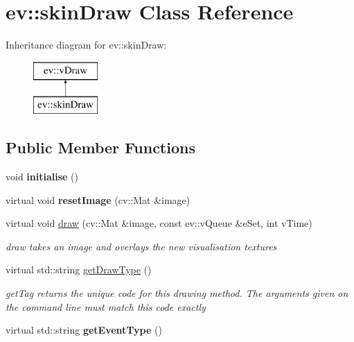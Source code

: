 \hypertarget{classev_1_1skinDraw}{}\section{ev\+:\+:skin\+Draw Class Reference}
\label{classev_1_1skinDraw}
Inheritance diagram for ev\+:\+:skin\+Draw\+:\begin{figure}[H]
\begin{center}
\leavevmode
\includegraphics[height=2.000000cm]{classev_1_1skinDraw}
\end{center}
\end{figure}
\subsection*{Public Member Functions}
\begin{DoxyCompactItemize}
\item 
\mbox{\label{classev_1_1skinDraw_ad3d3dab23e10ceafc546720fddab60e1}} 
void {\bfseries initialise} ()
\item 
\mbox{\label{classev_1_1skinDraw_a0203a5fa2e0d18785c96f1d8bcacbdfd}} 
virtual void {\bfseries reset\+Image} (cv\+::\+Mat \&image)
\item 
virtual void \hyperlink{classev_1_1skinDraw_a4cbf578dd04c6a634c8959fea7295060}{draw} (cv\+::\+Mat \&image, const ev\+::v\+Queue \&e\+Set, int v\+Time)
\begin{DoxyCompactList}\small\item\em draw takes an image and overlays the new visualisation textures \end{DoxyCompactList}\item 
virtual std\+::string \hyperlink{classev_1_1skinDraw_a7015a083dffe5c055808c20b9372bce4}{get\+Draw\+Type} ()
\begin{DoxyCompactList}\small\item\em get\+Tag returns the unique code for this drawing method. The arguments given on the command line must match this code exactly \end{DoxyCompactList}\item 
\mbox{\label{classev_1_1skinDraw_aa054c667234061c84ebcd94368bb5939}} 
virtual std\+::string {\bfseries get\+Event\+Type} ()
\end{DoxyCompactItemize}
